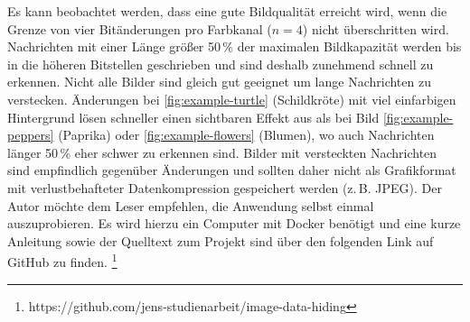 \newpage



\newpage



\newpage



\newpage

\noindent
Es kann beobachtet werden, dass
eine gute Bildqualität erreicht wird,
wenn die Grenze von vier Bitänderungen pro Farbkanal ($n = 4$) nicht überschritten wird.
Nachrichten mit einer Länge größer 50\,\% der maximalen Bildkapazität werden bis in die höheren
Bitstellen geschrieben und sind deshalb zunehmend schnell zu erkennen.
Nicht alle Bilder sind gleich gut geeignet um lange Nachrichten zu verstecken.
Änderungen bei \ref{fig:example-turtle} (Schildkröte) mit viel einfarbigen Hintergrund
lösen schneller einen sichtbaren Effekt aus als bei Bild \ref{fig:example-peppers}
(Paprika) oder \ref{fig:example-flowers} (Blumen), wo auch Nachrichten länger
50\,\% eher schwer zu erkennen sind. Bilder mit versteckten Nachrichten
sind empfindlich gegenüber Änderungen und sollten daher nicht als
Grafikformat mit verlustbehafteter Datenkompression gespeichert werden (z.\,B. JPEG).
Der Autor möchte dem Leser empfehlen, die Anwendung selbst einmal auszuprobieren.
Es wird hierzu ein Computer mit Docker benötigt und eine kurze Anleitung
sowie der Quelltext zum Projekt sind über den folgenden Link auf GitHub zu finden.
\footnote{https://github.com/jens-studienarbeit/image-data-hiding}
